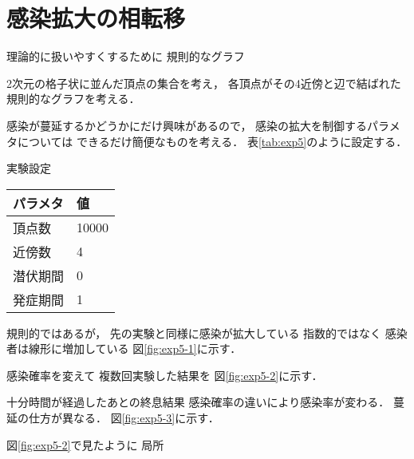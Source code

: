 \documentclass[10pt,oneside]{scrartcl}
\begin{document}
\section{感染拡大の相転移}
\label{sec:orgc99082a}

理論的に扱いやすくするために
規則的なグラフ

2次元の格子状に並んだ頂点の集合を考え，
各頂点がその4近傍と辺で結ばれた規則的なグラフを考える．

感染が蔓延するかどうかにだけ興味があるので，
感染の拡大を制御するパラメタについては
できるだけ簡便なものを考える．
表\ref{tab:exp5}のように設定する．

\begin{margintable}
  \caption{実験設定}
  \label{tab:exp5}
  \small
  \begin{tabular}{ll}
    \toprule
    パラメタ&値 \\
    \midrule
    頂点数&10000 \\
    近傍数&4 \\
    潜伏期間&0 \\
    発症期間&1 \\
    \bottomrule
  \end{tabular}
\end{margintable}

規則的ではあるが，
先の実験と同様に感染が拡大している
指数的ではなく
感染者は線形に増加している
図\ref{fig:exp5-1}に示す．

\begin{figure}[htbp]
  \centering
  \setcounter{GraphPage}{15}
  \setcounter{GraphPage}{30}
  \setcounter{GraphPage}{45}
  \setcounter{GraphPage}{60}
\end{figure}

感染確率を変えて
複数回実験した結果を
図\ref{fig:exp5-2}に示す．

\begin{figure}[htbp]
  \centering
\end{figure}

十分時間が経過したあとの終息結果
感染確率の違いにより感染率が変わる．
蔓延の仕方が異なる．
図\ref{fig:exp5-3}に示す．

図\ref{fig:exp5-2}で見たように
局所

\begin{figure*}%
  \centering
\end{figure*}
\end{document}
